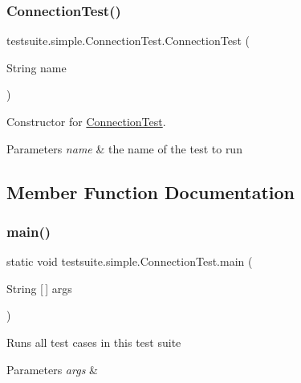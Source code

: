 \subsubsection{\texorpdfstring{Connection\+Test()}{ConnectionTest()}}
{\footnotesize\ttfamily testsuite.\+simple.\+Connection\+Test.\+Connection\+Test (\begin{DoxyParamCaption}\item[{String}]{name }\end{DoxyParamCaption})}

Constructor for \mbox{\hyperlink{classtestsuite_1_1simple_1_1_connection_test}{Connection\+Test}}.


\begin{DoxyParams}{Parameters}
{\em name} & the name of the test to run \\
\hline
\end{DoxyParams}


\subsection{Member Function Documentation}
\mbox{\label{classtestsuite_1_1simple_1_1_connection_test_a3f457b435e6cf75f31649400f2ce211d}} 
\subsubsection{\texorpdfstring{main()}{main()}}
{\footnotesize\ttfamily static void testsuite.\+simple.\+Connection\+Test.\+main (\begin{DoxyParamCaption}\item[{String \mbox{[}$\,$\mbox{]}}]{args }\end{DoxyParamCaption})\hspace{0.3cm}{\ttfamily [static]}}

Runs all test cases in this test suite


\begin{DoxyParams}{Parameters}
{\em args} & \\
\hline
\end{DoxyParams}
\mbox{\label{classtestsuite_1_1simple_1_1_connection_test_a00b269a0035eddf1f921422e0e01c4e2}} 
